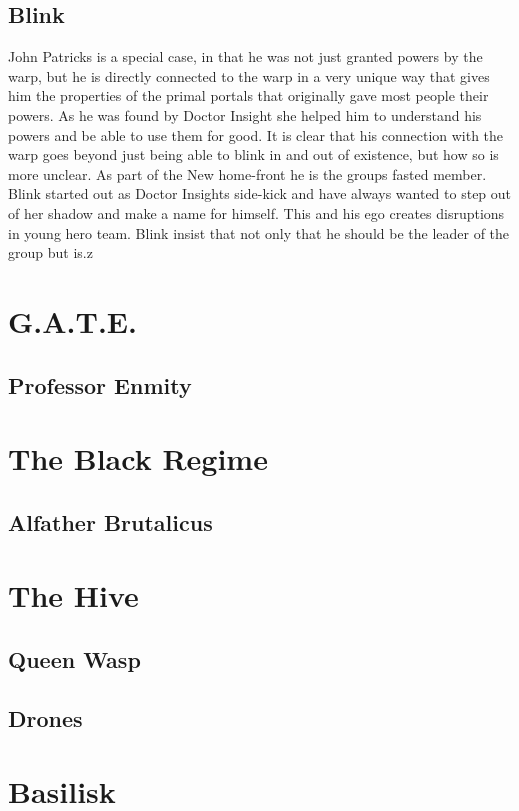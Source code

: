 \subsection{Blink}
John Patricks is a special case, in that he was not just granted powers by the warp, but he is directly connected to the warp in a very unique way that gives him the properties of the primal portals that originally gave most people their powers. As he was found by Doctor Insight she helped him to understand his powers and be able to use them for good. It is clear that his connection with the warp goes beyond just being able to blink in and out of existence, but how so is more unclear. As part of the New home-front he is the groups fasted member. Blink started out as Doctor Insights side-kick and have always wanted to step out of her shadow and make a name for himself. This and his ego creates disruptions in young hero team. Blink insist that not only that he should be the leader of the group but is.z
\pagebreak 

\section{G.A.T.E.}
\subsection{Professor Enmity}
\pagebreak 



\section{The Black Regime}
\subsection{Alfather Brutalicus}
\pagebreak 

\section{The Hive}
\subsection{Queen Wasp}
\subsection{Drones}
\pagebreak 

\section{Basilisk}
